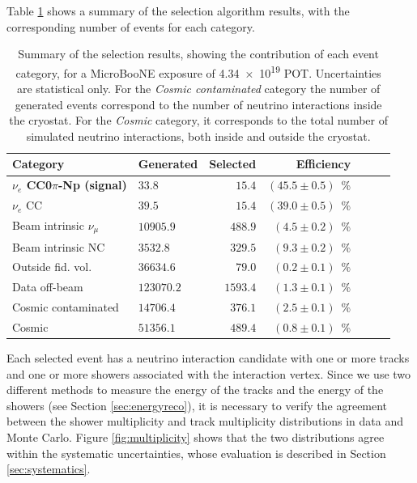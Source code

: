 Table \ref{tab:result} shows a summary of the selection algorithm results, with the corresponding number of events for each category.

\begin{table}[htbp]
   \centering
      \caption{Summary of the selection results, showing the contribution of each event category, for a MicroBooNE exposure of \num{4.34e19} POT. Uncertainties are statistical only. {For the \emph{Cosmic contaminated} category the number of generated events correspond to the number of neutrino interactions inside the cryostat. For the \emph{Cosmic} category, it corresponds to the total number of simulated neutrino interactions, both inside and outside the cryostat.}}\label{tab:result}
   \begin{tabular}{llrrrrr}
     \toprule
     Category & Generated & Selected & Efficiency \\
     \midrule

     \textbf{$\nu_{e}$ CC0$\pi$-Np (signal)}  & $33.8$    & $15.4$  & $(45.5\pm0.5)$~\%\\
     $\nu_{e}$ CC                             & $39.5$    & $15.4$  & $(39.0\pm0.5)$~\%\\
     Beam intrinsic $\nu_{\mu}$               & $10905.9$ & $488.9$ & $(4.5\pm0.2)$~\%\\
     Beam intrinsic NC                        & $3532.8$  & $329.5$ & $(9.3\pm0.2)$~\%\\
     Outside fid. vol.                        & $36634.6$ & $79.0$  & $(0.2\pm0.1)$~\%\\
     Data off-beam                            & $123070.2$ & $1593.4$ & $(1.3\pm0.1)$~\%\\
     Cosmic contaminated                      & $14706.4$  & $376.1$  & $(2.5\pm0.1)$~\%\\ 
     Cosmic                                   & $51356.1$  & $489.4$  & $(0.8\pm0.1)$~\%\\

     \bottomrule
   \end{tabular}

\end{table}

Each selected event has a neutrino interaction candidate with one or more tracks and one or more showers associated with the interaction vertex. Since we use two different methods to measure the energy of the tracks and the energy of the showers (see Section \ref{sec:energyreco}), it is necessary to verify the agreement between the shower multiplicity and track multiplicity distributions in data and Monte Carlo. Figure \ref{fig:multiplicity} shows that the two distributions agree within the systematic uncertainties, whose evaluation is described in Section \ref{sec:systematics}.


